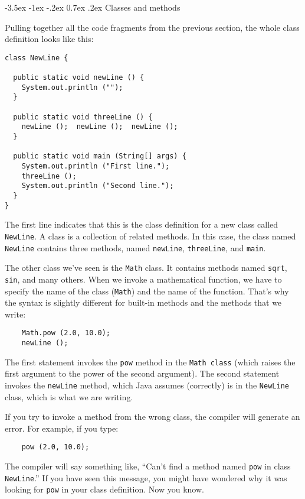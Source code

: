 \documentclass{book}
\makeatletter
\renewcommand{\section}{\@startsection 
    {section} {1} {0mm}%
    {-3.5ex \@plus -1ex \@minus -.2ex}%
    {0.7ex \@plus.2ex}%
    {\normalfont\Large\bfseries}}
\makeatother
\begin{document}
\section{Classes and methods}

Pulling together all the code fragments from the previous
section, the whole class definition looks like this:

\begin{verbatim}
class NewLine {

  public static void newLine () {
    System.out.println ("");
  }

  public static void threeLine () {
    newLine ();  newLine ();  newLine ();
  }

  public static void main (String[] args) {
    System.out.println ("First line.");
    threeLine ();
    System.out.println ("Second line.");
  }
}
\end{verbatim}
%
The first line indicates that this is the class definition for a new
class called {\tt NewLine}.  A class is a collection of related
methods.  In this case, the class named {\tt NewLine} contains three
methods, named {\tt newLine}, {\tt threeLine}, and {\tt main}.

The other class we've seen is the {\tt Math} class.  It contains
methods named {\tt sqrt}, {\tt sin}, and many others.  When
we invoke a mathematical function, we have to specify
the name of the class ({\tt Math}) and the name of the function.
That's why the syntax is slightly different for built-in
methods and the methods that we write:

\begin{verbatim}
    Math.pow (2.0, 10.0);
    newLine ();
\end{verbatim}
%
The first statement invokes the {\tt pow} method in
the {\tt Math class} (which raises the first argument to the
power of the second argument).  The second statement invokes
the {\tt newLine} method, which Java assumes (correctly)
is in the {\tt NewLine} class, which is what we are writing.

If you try to invoke a method from the wrong class, the
compiler will generate an error.  For example, if you
type:

\begin{verbatim}
    pow (2.0, 10.0);
\end{verbatim}
%
The compiler will say something like, ``Can't find a method
named {\tt pow} in class {\tt NewLine}.''  If you have
seen this message, you might have wondered why it was looking
for {\tt pow} in your class definition.  Now you know.
\end{document}
